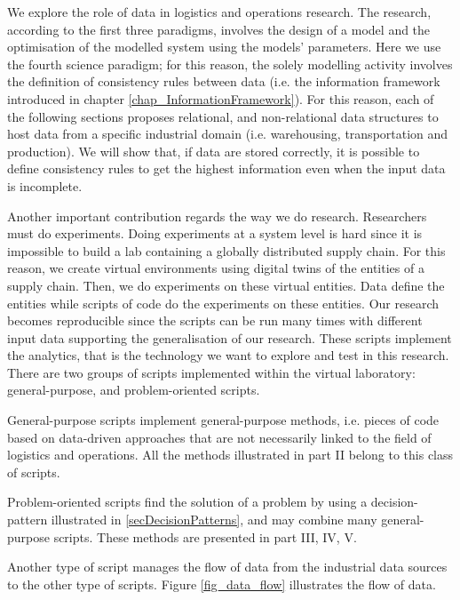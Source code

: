 We explore the role of data in logistics and operations research. The research, according to the first three paradigms, involves the design of a model and the optimisation of the modelled system using the models’ parameters. Here we use the fourth science paradigm; for this reason, the solely modelling activity involves the definition of consistency rules between data (i.e. the information framework introduced in chapter \ref{chap_InformationFramework}). For this reason, each of the following sections proposes relational, and non-relational data structures to host data from a specific industrial domain (i.e. warehousing, transportation and production). We will show that, if data are stored correctly, it is possible to define consistency rules to get the highest information even when the input data is incomplete. \par

Another important contribution regards the way we do research. Researchers must do experiments. Doing experiments at a system level is hard since it is impossible to build a lab containing a globally distributed supply chain. For this reason, we create virtual environments using digital twins of the entities of a supply chain. Then, we do experiments on these virtual entities. Data define the entities while scripts of code do the experiments on these entities. Our research becomes reproducible since the scripts can be run many times with different input data supporting the generalisation of our research. These scripts implement the analytics, that is the technology we want to explore and test in this research. There are two groups of scripts implemented within the virtual laboratory: general-purpose, and problem-oriented scripts.\par

General-purpose scripts implement general-purpose methods, i.e. pieces of code based on data-driven approaches that are not necessarily linked to the field of logistics and operations. All the methods illustrated in part II belong to this class of scripts.\par

Problem-oriented scripts find the solution of a problem by using a decision-pattern illustrated in \ref{secDecisionPatterns}, and may combine many general-purpose scripts. These methods are presented in part III, IV, V. \par

Another type of script manages the flow of data from the industrial data sources to the other type of scripts. Figure \ref{fig_data_flow} illustrates the flow of data. 

